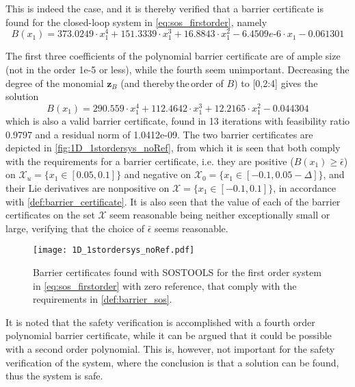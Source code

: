 \vspace{-5mm}
This is indeed the case, and it is thereby verified that a barrier certificate is found for the closed-loop system in \autoref{eq:sos_firstorder}, namely
\vspace{-2mm}
\begin{equation}
B(x_1) = 373.0249\cdot x_1^4 + 151.3339\cdot x_1^3 + 16.8843\cdot x_1^2 - 6.4509e\text{-}6\cdot x_1 - 0.061301
\end{equation}

\vspace{-3mm}
The first three coefficients of the polynomial barrier certificate are of ample size (not in the order 1e-5 or less), while the fourth seem unimportant. Decreasing the degree of the monomial $\mathbf{z}_B$ (and thereby\,the\,order of $B$) to [0,2:4] %
gives the solution
\begin{equation}
B(x_1) = 290.559\cdot x_1^4 + 112.4642\cdot x_1^3 + 12.2165\cdot x_1^2 - 0.044304
\end{equation}
which is also a valid barrier certificate, found in 13 iterations with feasibility ratio 0.9797 and a residual norm of 1.0412e-09.
The two barrier certificates are depicted in \autoref{fig:1D_1stordersys_noRef}, from which it is seen that  both comply with the requirements for a barrier certificate, i.e. they are positive ($B(x_1)\geq \bar{\epsilon}$) on $\mathcal{X}_u=\{x_1\in [0.05,0.1]\}$ and negative on $\mathcal{X}_0=\{x_1\in [-0.1,0.05-\Delta]\}$, and their Lie derivatives are nonpositive on $\mathcal{X}=\{x_1\in [-0.1,0.1]\}$, in accordance with \autoref{def:barrier_certificate}. It is also seen that the value of each of the barrier certificates on the set $\mathcal{X}$ seem reasonable being neither exceptionally small or large, verifying that the choice of $\bar{\epsilon}$ seems reasonable.

\begin{figure}[htbp]
\centering%
\texttt{[image: 1D\_1stordersys\_noRef.pdf]}
	\caption{Barrier certificates found with SOSTOOLS for the first order system in \autoref{eq:sos_firstorder} with zero reference,  that comply with the requirements in \autoref{def:barrier_sos}. }
	\label{fig:1D_1stordersys_noRef}
\end{figure}

It is noted that the safety verification is accomplished with a fourth order polynomial barrier certificate, while it can be argued that it could be possible with a second order polynomial. This is, however, not important for the safety verification of the system, where the conclusion is that a solution can be found, thus the system is safe.










